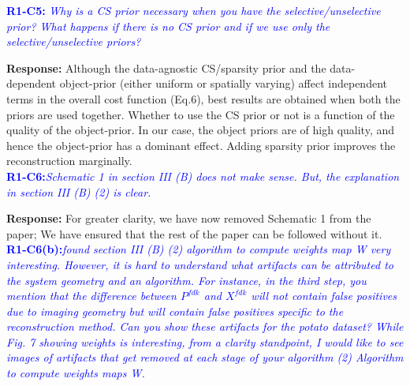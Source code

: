 \documentclass{article}
\begin{document}
\textcolor{blue}{\textbf{R1-C5:} \textit{Why is a CS prior necessary when you have the selective/unselective prior? What happens if there is no CS prior and if we use only the selective/unselective priors?}}

\textbf{Response:} Although the data-agnostic CS/sparsity  prior and the data-dependent object-prior  (either uniform or spatially varying) affect independent terms in the overall cost function (Eq.6), best results are obtained when both the priors are used together. Whether to use the CS prior or not is a function of the quality of the object-prior. In our case, the object priors are of high quality, and hence the object-prior has a dominant effect. Adding sparsity prior improves the reconstruction marginally.\\

\textcolor{blue}{\textbf{R1-C6:}\textit{Schematic 1 in section III (B) does not make sense. But, the explanation in section III (B) (2) is clear.}}

\textbf{Response:}  For greater clarity, we have now removed Schematic 1 from the paper; We have  ensured that the rest of the paper can be followed without it.\\

\textcolor{blue}{\textbf{R1-C6(b):}\textit{found section III (B) (2) algorithm to compute weights map W very interesting. However, it is hard to understand what artifacts can be attributed to the system geometry and an algorithm. For instance, in the third step, you mention that the difference between $P^{fdk}$ and $X^{fdk}$ will not contain false positives due to imaging geometry but will contain false positives specific to the reconstruction method. Can you show these artifacts for the potato dataset? While Fig. 7 showing weights is interesting, from a clarity standpoint, I would like to see images of artifacts that get removed at each stage of your algorithm (2) Algorithm to compute weights maps W.}}
\end{document}
